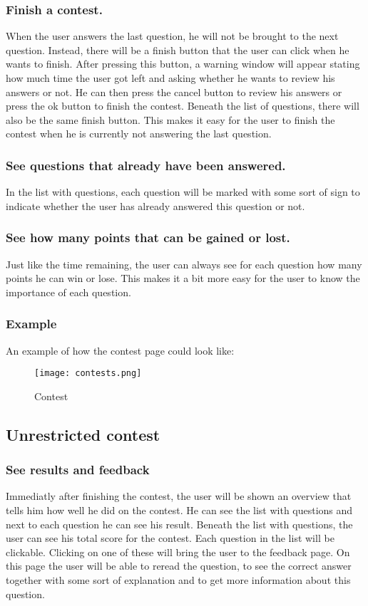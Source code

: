 \subsubsection{Finish a contest.} 
When the user answers the last question, he will not be brought to the next question. Instead, there will be a finish button that the user can click when he wants to finish. After pressing this button, a warning window will appear stating how much time the user got left and asking whether he wants to review his answers or not. He can then press the cancel button to review his answers or press the ok button to finish the contest. Beneath the list of questions, there will also be the same finish button. This makes it easy for the user to finish the contest when he is currently not answering the last question. 

\subsubsection{See questions that already have been answered.} 
In the list with questions, each question will be marked with some sort of sign to indicate whether the user has already answered this question or not. 

\subsubsection{See how many points that can be gained or lost.}
Just like the time remaining, the user can always see for each question how many points he can win or lose. This makes it a bit more easy for the user to know the importance of each question. 

\subsubsection{Example}
An example of how the contest page could look like: 
		\begin{figure}[h]
		  \centering
			\texttt{[image: contests.png]}
		  \caption{Contest}
		  \label{Contest}
		\end{figure}

\subsection{Unrestricted contest}

\subsubsection{See results and feedback}
Immediatly after finishing the contest, the user will be shown an overview that tells him how well he did on the contest. He can see the list with questions and next to each question he can see his result. Beneath the list with questions, the user can see his total score for the contest. Each question in the list will be clickable. Clicking on one of these will bring the user to the feedback page. On this page the user will be able to reread the question, to see the correct answer together with some sort of explanation and to get more information about this question.  

